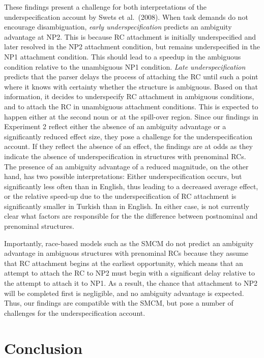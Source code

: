\documentclass[english, doc]{apa7}\usepackage[]{graphicx}\usepackage[]{color}
\begin{document}
These findings present a challenge for both interpretations of the underspecification account by Swets et al.~(2008). When task demands do not encourage disambiguation, \emph{early underspecification} predicts an ambiguity advantage at NP2. This is because RC attachment is initially underspecified and later resolved in the NP2 attachment condition, but remains underspecified in the NP1 attachment condition. This should lead to a speedup in the ambiguous condition relative to the unambiguous NP1 condition. \emph{Late underspecification} predicts that the parser delays the process of attaching the RC until such a point where it knows with certainty whether the structure is ambiguous. Based on that information, it decides to underspecify RC attachment in ambiguous conditions, and to attach the RC in unambiguous attachment conditions. This is expected to happen either at the second noun or at the spill-over region. 
Since our findings in Experiment 2 reflect either the absence of an ambiguity advantage or a significantly reduced effect size, they pose a challenge for the underspecification account. If they reflect the absence of an effect, the findings are at odds as they indicate the absence of underspecification in structures with prenominal RCs.
The presence of an ambiguity advantage of a reduced magnitude, on the other hand, has two possible interpretations: Either underspecification occurs, but significantly less often than in English, thus leading to a decreased average effect, or the relative speed-up due to the underspecification of RC attachment is significantly smaller in Turkish than in English.
In either case, is not currently clear what factors are responsible for the the difference between postnominal and prenominal structures.

Importantly, race-based models such as the SMCM \citep{LogacevVasishth:2016} do not predict an ambiguity advantage in ambiguous structures with prenominal RCs because they assume that RC attachment begins at the earliest opportunity, which means that an attempt to attach the RC to NP2 must begin with a significant delay relative to the attempt to attach it to NP1. As a result, the chance that attachment to NP2 will be completed first is negligible, and no ambiguity advantage is expected. Thus, our findings are compatible with the SMCM, but pose a number of challenges for the underspecification account.


\section{Conclusion}
\end{document}

